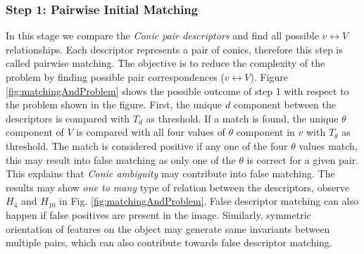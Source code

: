 \documentclass{bmvc2k}
\begin{document}
\subsubsection{Step 1: Pairwise Initial Matching}
\label{subsubSec:PIM}
In this stage we compare the \textit{Conic pair descriptors} and find all possible $ v \leftrightarrow V $ relationships.
Each descriptor represents a pair of conics, therefore this step is called pairwise matching.
The objective is to reduce the complexity of the problem by finding possible pair correspondences ($ v \leftrightarrow V $). 
Figure \ref{fig:matchingAndProblem} shows the possible outcome of step 1 with respect to the problem shown in the figure.
First, the unique $ d $ component between the descriptors is compared with $ T_d $ as threshold.
If a match is found, the unique $ \theta $ component of $ V $ is compared with all four values of $ \theta $ component in $ v $ with $ T_\theta $ as threshold.
The match is considered positive if any one of the four $ \theta $ values match, this may result into false matching as only one of the $ \theta $ is correct for a given pair. 
This explains that \textit{Conic ambiguity} may contribute into false matching. 
The results may show \textit{one to many} type of relation between the descriptors, observe $ H_4 $ and $ H_{10} $ in Fig. \ref{fig:matchingAndProblem}. 
False descriptor matching can also happen if false positives are present in the image. 
Similarly, symmetric orientation of features on the object may generate same invariants between multiple pairs, which can also contribute towards false descriptor matching. 

\end{document}
